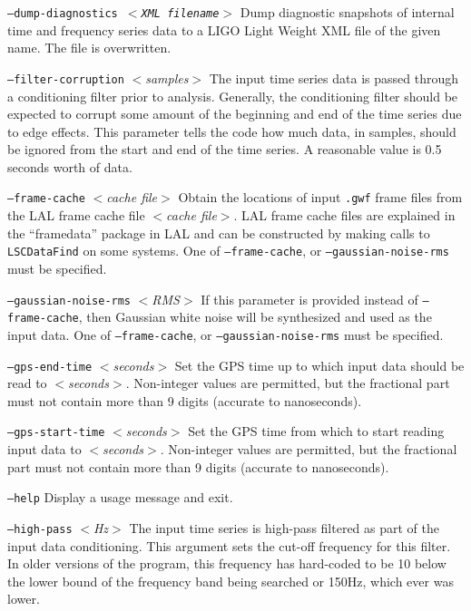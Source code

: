 \documentclass{article}
\newcommand{\prog}[1]{\texttt{#1}}
\newcommand{\option}[1]{\texttt{#1}}
\newcommand{\parm}[1]{$<$\textit{#1}$>$}
\newenvironment{entry}%
  {\begin{list}{}{\renewcommand{\makelabel}[1]%
    {\parbox[b]{\labelwidth}{\makebox[0pt][l]{\textbf{##1}}\\}}%
    \setlength{\labelwidth}{1em}%
    \setlength{\labelsep}{1em}%
    \setlength{\leftmargin}{2em}%
    \setlength{\topsep}{\medskipamount}%
    \setlength{\itemsep}{\medskipamount}%
    \setlength{\parsep}{\medskipamount}%
    \setlength{\listparindent}{0pt}}}
  {\end{list}}
\begin{document}
\begin{entry}
\begin{entry}
\item[\option{--dump-diagnostics \parm{XML filename}}]
Dump diagnostic snapshots of internal time and frequency series data to a
LIGO Light Weight XML file of the given name.  The file is overwritten.

\item[\option{--filter-corruption} \parm{samples}]
The input time series data is passed through a conditioning filter prior to
analysis.  Generally, the conditioning filter should be expected to corrupt
some amount of the beginning and end of the time series due to edge
effects.  This parameter tells the code how much data, in samples, should
be ignored from the start and end of the time series.  A reasonable value
is 0.5 seconds worth of data.

\item[\option{--frame-cache} \parm{cache file}]
Obtain the locations of input \texttt{.gwf} frame files from the LAL frame
cache file \parm{cache file}.  LAL frame cache files are explained in the
``framedata'' package in LAL and can be constructed by making calls to
\prog{LSCDataFind} on some systems.  One of \option{--frame-cache}, or
\option{--gaussian-noise-rms} must be specified.

\item[\option{--gaussian-noise-rms} \parm{RMS}]
If this parameter is provided instead of \option{--frame-cache}, then
Gaussian white noise will be synthesized and used as the input data.  One
of \option{--frame-cache}, or \option{--gaussian-noise-rms} must be
specified.

\item[\option{--gps-end-time} \parm{seconds}]
Set the GPS time up to which input data should be read to \parm{seconds}.
Non-integer values are permitted, but the fractional part must not contain
more than 9 digits (accurate to nanoseconds).

\item[\option{--gps-start-time} \parm{seconds}]
Set the GPS time from which to start reading input data to \parm{seconds}.
Non-integer values are permitted, but the fractional part must not contain
more than 9 digits (accurate to nanoseconds).

\item[\option{--help}]
Display a usage message and exit.

\item[\option{--high-pass} \parm{Hz}]
The input time series is high-pass filtered as part of the input data
conditioning.  This argument sets the cut-off frequency for this filter.
In older versions of the program, this frequency has hard-coded to be
\unit{10}{\hertz} below the lower bound of the frequency band being
searched or \unit{150}{Hz}, which ever was lower.


\end{entry}
\end{entry}
\end{document}
